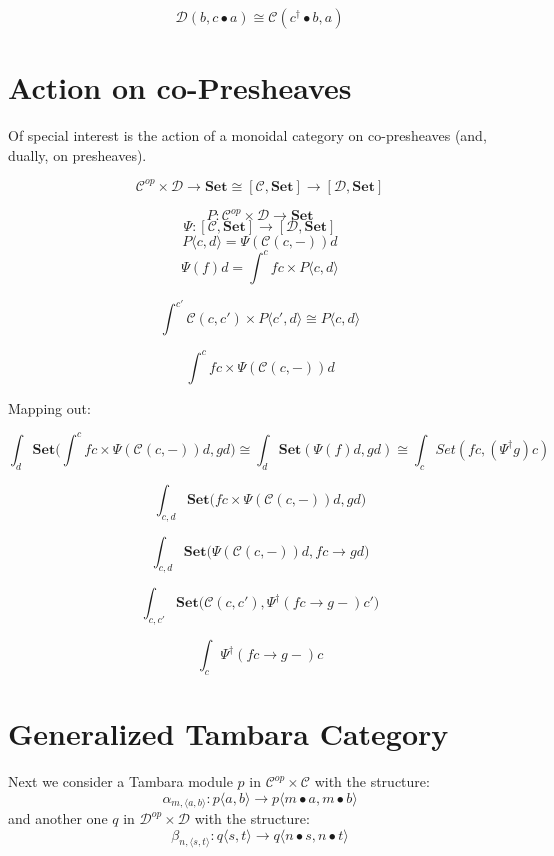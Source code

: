 \documentclass[11pt]{amsart}
\newcommand{\cat}[1]{\mathcal{#1}}%
\newcommand{\Cat}[1]{\mathbf{#1}}%
\begin{document}
\[ \cat D (b, c \bullet a) \cong \cat C (c^{\dagger} \bullet b, a) \]

\section{Action on co-Presheaves}

Of special interest is the action of a monoidal category on co-presheaves (and, dually, on presheaves). 

\[ \cat C^{op} \times \cat D \to \Cat{Set} \cong [\cat C, \Cat{Set}] \to [\cat D, \Cat{Set}] \]

\[ P \colon  \cat C^{op} \times \cat D \to \Cat{Set} \]
\[ \Psi \colon [\cat C, \Cat{Set}] \to  [\cat D, \Cat{Set}]\]
\[ P \langle c, d \rangle = \Psi ( \cat C (c, -)) d\]
\[ \Psi (f) d = \int^c f c \times P \langle c, d \rangle \]

\[  \int^{c'} \cat C (c, c') \times P \langle c', d \rangle \cong P \langle c, d\rangle \]

\[ \int^c f c \times \Psi ( \cat C (c, -)) d \]

Mapping out:

\[ \int_d \Cat{Set}\big( \int^c f c \times \Psi ( \cat C (c, -)) d, g d \big) \cong \int_d \Cat{Set} (\Psi (f) d, g d) \cong \int_c Set(f c, (\Psi^{\dagger} g) c)\]

\[ \int_{c,d} \Cat{Set}\big( f c \times \Psi ( \cat C (c, -)) d, g d \big)\]

\[ \int_{c,d} \Cat{Set}\big(\Psi ( \cat C (c, -)) d, f c \to g d \big)\]

\[ \int_{c,c'} \Cat{Set}\big( \cat C (c, c'), \Psi^{\dagger} (f c \to g -) c' \big)\]

\[ \int_{c}  \Psi^{\dagger} (f c \to g -) c \]


\section{Generalized Tambara Category}


Next we consider a Tambara module $p$ in $\cat C^{op} \times \cat C$ with the structure:
\[ \alpha_{m, \langle a, b \rangle} \colon p \langle a, b \rangle \to p \langle m \bullet a, m \bullet b \rangle \]
and another one $q$ in $\cat D^{op} \times \cat D$  with the structure:
\[ \beta_{n, \langle s, t \rangle} \colon q \langle s, t \rangle \to q \langle n \bullet s, n \bullet t \rangle \]
\end{document}
